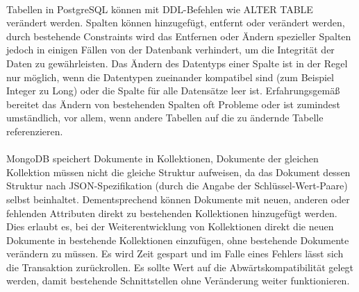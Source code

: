 \paragraph{}
Tabellen in PostgreSQL können mit DDL-Befehlen wie ALTER TABLE verändert werden. Spalten können hinzugefügt, entfernt oder verändert werden, durch bestehende Constraints wird das Entfernen oder Ändern spezieller Spalten jedoch in einigen Fällen von der Datenbank verhindert, um die Integrität der Daten zu gewährleisten. Das Ändern des Datentyps einer Spalte ist in der Regel nur möglich, wenn die Datentypen zueinander kompatibel sind (zum Beispiel Integer zu Long) oder die Spalte für alle Datensätze leer ist. Erfahrungsgemäß bereitet das Ändern von bestehenden Spalten oft Probleme oder ist zumindest umständlich, vor allem, wenn andere Tabellen auf die zu ändernde Tabelle referenzieren.

\paragraph{}
MongoDB speichert Dokumente in Kollektionen, Dokumente der gleichen Kollektion müssen nicht die gleiche Struktur aufweisen, da das Dokument dessen Struktur nach JSON-Spezifikation (durch die Angabe der Schlüssel-Wert-Paare) selbst beinhaltet. Dem\-entsprechend können Dokumente mit neuen, anderen oder fehlenden Attributen direkt zu bestehenden Kollektionen hinzugefügt werden. Dies erlaubt es, bei der Weiterentwicklung von Kollektionen direkt die neuen Dokumente in bestehende Kollektionen einzufügen, ohne bestehende Dokumente verändern zu müssen. Es wird Zeit gespart und im Falle eines Fehlers lässt sich die Transaktion zurückrollen. Es sollte Wert auf die Abwärtskompatibilität gelegt werden, damit bestehende Schnittstellen ohne Veränderung weiter funktionieren.


